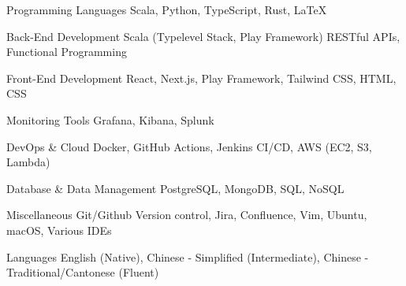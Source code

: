 
\begin{sloppypar} %
\small %
\begin{cvskills}

  \cvskill
  {Programming Languages} 
  {Scala, Python, TypeScript, Rust, LaTeX}

  \cvskill
  {Back-End Development} 
  {Scala (Typelevel Stack, Play Framework) RESTful APIs, Functional Programming} 

  \cvskill
  {Front-End Development} 
  {React, Next.js, Play Framework, Tailwind CSS, HTML, CSS}

\cvskill
  {Monitoring Tools} 
  {Grafana, Kibana, Splunk} 

  \cvskill
  {DevOps \& Cloud} 
  {Docker, GitHub Actions, Jenkins CI/CD, AWS (EC2, S3, Lambda)}

  \cvskill
  {Database \& Data Management} 
  {PostgreSQL, MongoDB, SQL, NoSQL}

\cvskill
  {Miscellaneous} 
  {Git/Github Version control, Jira, Confluence, Vim, Ubuntu, macOS, Various IDEs} 

  \cvskill
  {Languages} 
  {English (Native), Chinese - Simplified (Intermediate), Chinese - Traditional/Cantonese (Fluent)}

\end{cvskills}
\normalsize
\end{sloppypar}
